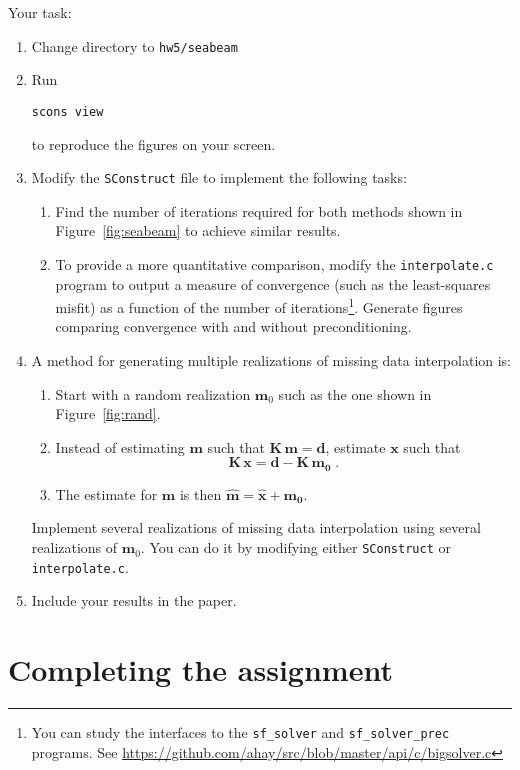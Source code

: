 Your task:
\begin{enumerate}
\item Change directory to \texttt{hw5/seabeam}
\item Run 
\begin{verbatim}
scons view
\end{verbatim}
to reproduce the figures on your screen.
\item Modify the \texttt{SConstruct} file to implement the following tasks:
\begin{enumerate}
\item Find the number of iterations required for both methods shown in Figure~\ref{fig:seabeam} to achieve similar results.
\item To provide a more quantitative comparison, modify the
\texttt{interpolate.c} program to output a measure of convergence
(such as the least-squares misfit) as a function of the number
of iterations\footnote{You can study the interfaces to
the \texttt{sf\_solver} and
\texttt{sf\_solver\_prec} programs. See
\url{https://github.com/ahay/src/blob/master/api/c/bigsolver.c}}. Generate figures comparing convergence with and without preconditioning.
\end{enumerate}
\item A method for generating multiple realizations of missing data interpolation is:
\begin{enumerate}
\item Start with a random realization $\mathbf{m}_0$ such as the one shown in Figure~\ref{fig:rand}.
\item Instead of estimating $\mathbf{m}$ such that $\mathbf{K}\,\mathbf{m} = \mathbf{d}$, 
      estimate $\mathbf{x}$ such that 
\[
\mathbf{K}\,\mathbf{x} = \mathbf{d}- \mathbf{K}\,\mathbf{m_0}\;.
\]
\item The estimate for $\mathbf{m}$ is then  $\widehat{\mathbf{m}} = \widehat{\mathbf{x}}+\mathbf{m_0}$.
\end{enumerate}
Implement several realizations of missing data interpolation using
several realizations of $\mathbf{m}_0$. You can do it by modifying
either \texttt{SConstruct} or \texttt{interpolate.c}.
\item Include your results in the paper.
\end{enumerate}


\section{Completing the assignment}

